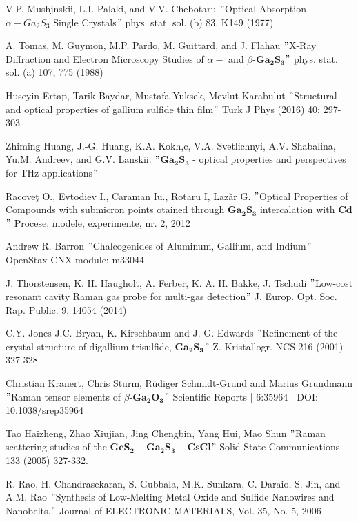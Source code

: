 \begin{thebibliography}{}
	 V.P. Mushjnskii, L.I. Palaki, and V.V. Chebotaru $"$Optical Absorption $\alpha-Ga_{2}S_{3}$ Single Crystals$"$ phys. stat. sol. (b) 83, K149 (1977)
	
	 A. Tomas, M. Guymon, M.P. Pardo, M. Guittard, and J. Flahau $"$X-Ray Diffraction and Electron Microscopy Studies of $\alpha-$ and $\beta$-$\mathbf{Ga_{2}S_{3}}$$"$ phys. stat. sol. (a) 107, 775 (1988)
	
	 Huseyin Ertap, Tarik Baydar, Mustafa Yuksek, Mevlut Karabulut $"$Structural and optical properties of gallium sulfide thin film$"$ Turk J Phys (2016) 40: 297-303
	
	 Zhiming Huang, J.-G. Huang, K.A. Kokh,c, V.A. Svetlichnyi, A.V. Shabalina, Yu.M. Andreev, and G.V. Lanskii. $"$$\mathbf{Ga_{2}S_{3}}$ - optical properties and perspectives for THz applications$"$
	 
	 Racoveţ O., Evtodiev I., Caraman Iu., Rotaru I, Lazăr G.
	$"$Optical Properties of Compounds with submicron points otained
	through $\mathbf{Ga_{2}S_{3}}$ intercalation with $\mathbf{Cd}$$"$  Procese, modele, experimente, nr. 2, 2012
	
	 Andrew R. Barron $"$Chalcogenides of Aluminum,
	Gallium, and Indium$"$ OpenStax-CNX module: m33044
	
	 J. Thorstensen, K. H. Haugholt, A. Ferber, K. A. H. Bakke, J. Tschudi $"$Low-cost resonant cavity Raman gas probe for multi-gas
	detection$"$ J. Europ. Opt. Soc. Rap. Public. 9, 14054 (2014)
	
	 C.Y. Jones J.C. Bryan, K. Kirschbaum and J. G. Edwards $"$Refinement of the crystal structure of digallium trisulfide, $\mathbf{Ga_{2}S_{3}}$$"$ Z. Kristallogr. NCS 216 (2001) 327-328
	
	 Christian Kranert, Chris Sturm, Rüdiger Schmidt-Grund and Marius Grundmann $"$Raman tensor elements of $\beta$-$\mathbf{Ga_{2}O_{3}}$$"$ Scientific Reports | 6:35964 | DOI: 10.1038/srep35964
	 
	 Tao Haizheng, Zhao Xiujian, Jing Chengbin, Yang Hui, Mao Shun $"$Raman scattering studies of the $\mathbf{GeS_{2}-Ga_{2}S_{3}-CsCl}$$"$ Solid State Communications 133 (2005) 327-332.
	
	 R. Rao, H. Chandrasekaran, S. Gubbala, M.K. Sunkara,
	C. Daraio, S. Jin, and A.M. Rao $"$Synthesis of Low-Melting Metal Oxide and
	Sulfide Nanowires and Nanobelts.$"$ Journal of ELECTRONIC MATERIALS, Vol. 35, No. 5, 2006
	

\end{thebibliography}
